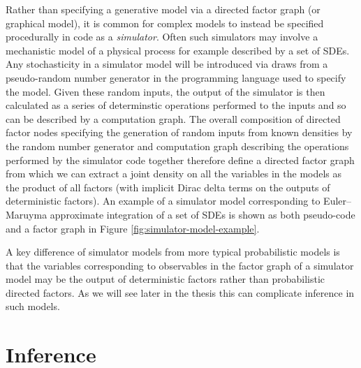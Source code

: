 Rather than specifying a generative model via a directed factor graph (or graphical model), it is common for complex models to instead be specified procedurally in code as a \emph{simulator}. Often such simulators may involve a mechanistic model of a physical process for example described by a set of \acfp{SDE}. Any stochasticity in a simulator model will be introduced via draws from a pseudo-random number generator in the programming language used to specify the model. Given these random inputs, the output of the simulator is then calculated as a series of determinstic operations performed to the inputs and so can be described by a computation graph. The overall composition of directed factor nodes specifying the generation of random inputs from known densities by the random number generator and computation graph describing the operations performed by the simulator code together therefore define a directed factor graph from which we can extract a joint density on all the variables in the models as the product of all factors (with implicit Dirac delta terms on the outputs of deterministic factors).  An example of a simulator model corresponding to Euler--Maruyma approximate integration \citep{kloeden1992numerical} of a set of \acp{SDE} is shown as both pseudo-code and a factor graph in Figure \ref{fig:simulator-model-example}.

A key difference of simulator models from more typical probabilistic models is that the variables corresponding to observables in the factor graph of a simulator model may be the output of deterministic factors rather than probabilistic directed factors. As we will see later in the thesis this can complicate inference in such models. 

\newpage

\section{Inference}

